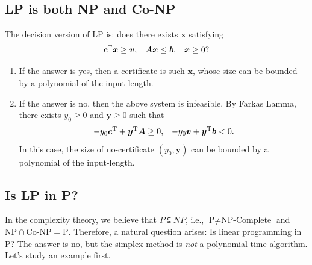 \subsection{LP is both NP and Co-NP}
The decision version of LP is: does there exists $\bm x$ satisfying
\[
\begin{array}{lll}
\bm c^{\mathrm T}\bm x\ge\bm v,
&
\bm{Ax}\le\bm b,
&
\bm x\ge0?
\end{array}
\]
\begin{enumerate}
\item
If the answer is yes, then a certificate is such $\bm x$, whose size can be bounded by a polynomial of the input-length.
\item
If the answer is no, then the above system is infeasible. By Farkas Lamma, there exists $y_0\ge0$ and $\bm y\ge0$ such that 
\[
\begin{array}{ll}
-y_0\bm c^{\mathrm T} + \bm y^{\mathrm T}\bm A\ge0,
&
-y_0\bm v + \bm y^{\mathrm T}\bm b<0.
\end{array}
\]
In this case, the size of no-certificate $(y_0,\bm y)$ can be bounded by a polynomial of the input-length.
\end{enumerate}

\subsection{Is LP in P?}

In the complexity theory, we believe that $P\subsetneqq NP$, i.e., $\text{P} \ne \text{NP-Complete}$ and $\text{NP}\cap\text{Co-NP}  =\text{P}$. Therefore, a natural question arises: Is linear programming in P? The answer is no, but the simplex method is \emph{not} a polynomial time algorithm. Let's study an example first.

